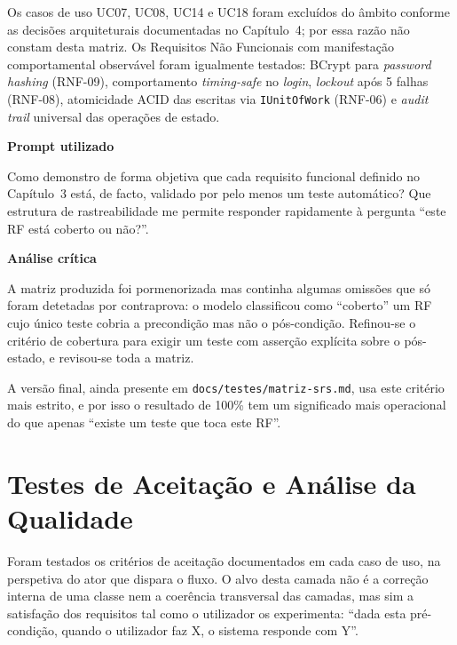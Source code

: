     Os casos de uso UC07, UC08, UC14 e UC18 foram excluídos do âmbito conforme as decisões arquiteturais documentadas no Capítulo~4; por essa razão não constam desta matriz. Os Requisitos Não Funcionais com manifestação comportamental observável foram igualmente testados: BCrypt para \textit{password hashing} (RNF-09), comportamento \textit{timing-safe} no \textit{login}, \textit{lockout} após 5 falhas (RNF-08), atomicidade ACID das escritas via \texttt{IUnitOfWork} (RNF-06) e \textit{audit trail} universal das operações de estado.

    \begin{tcolorbox}[title=Interação com o LLM]
    \textbf{Prompt utilizado}

    Como demonstro de forma objetiva que cada requisito funcional definido no Capítulo~3 está, de facto, validado por pelo menos um teste automático? Que estrutura de rastreabilidade me permite responder rapidamente à pergunta ``este RF está coberto ou não?''.

    \tcblower

    \textbf{Análise crítica}

    A matriz produzida foi pormenorizada mas continha algumas omissões que só foram detetadas por contraprova: o modelo classificou como ``coberto'' um RF cujo único teste cobria a precondição mas não o pós-condição. Refinou-se o critério de cobertura para exigir um teste com asserção explícita sobre o pós-estado, e revisou-se toda a matriz.

    A versão final, ainda presente em \texttt{docs/testes/matriz-srs.md}, usa este critério mais estrito, e por isso o resultado de 100\% tem um significado mais operacional do que apenas ``existe um teste que toca este RF''.
    \end{tcolorbox}

\section{Testes de Aceitação e Análise da Qualidade}

    Foram testados os critérios de aceitação documentados em cada caso de uso, na perspetiva do ator que dispara o fluxo. O alvo desta camada não é a correção interna de uma classe nem a coerência transversal das camadas, mas sim a satisfação dos requisitos tal como o utilizador os experimenta: ``dada esta pré-condição, quando o utilizador faz X, o sistema responde com Y''.

